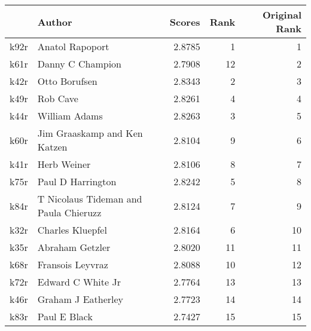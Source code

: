 \begin{tabular}{llrrr}
\toprule
{} &                                 Author &  Scores &  Rank &  Original Rank \\
\midrule
k92r &                        Anatol Rapoport &  2.8785 &     1 &              1 \\
k61r &                       Danny C Champion &  2.7908 &    12 &              2 \\
k42r &                          Otto Borufsen &  2.8343 &     2 &              3 \\
k49r &                               Rob Cave &  2.8261 &     4 &              4 \\
k44r &                          William Adams &  2.8263 &     3 &              5 \\
k60r &           Jim Graaskamp and Ken Katzen &  2.8104 &     9 &              6 \\
k41r &                            Herb Weiner &  2.8106 &     8 &              7 \\
k75r &                      Paul D Harrington &  2.8242 &     5 &              8 \\
k84r &  T Nicolaus Tideman and Paula Chieruzz &  2.8124 &     7 &              9 \\
k32r &                       Charles Kluepfel &  2.8164 &     6 &             10 \\
k35r &                        Abraham Getzler &  2.8020 &    11 &             11 \\
k68r &                       Fransois Leyvraz &  2.8088 &    10 &             12 \\
k72r &                      Edward C White Jr &  2.7764 &    13 &             13 \\
k46r &                     Graham J Eatherley &  2.7723 &    14 &             14 \\
k83r &                           Paul E Black &  2.7427 &    15 &             15 \\
\bottomrule
\end{tabular}
